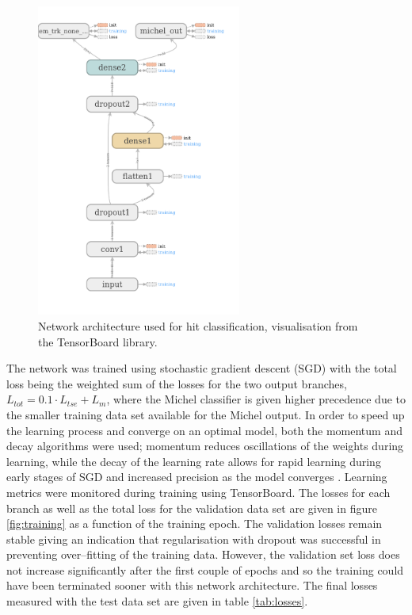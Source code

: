 \begin{figure}[h]
	\centering
	\includegraphics[width=0.6\textwidth]{figures/network_graph.png}
	\caption[Network architecture used for hit classification.]{Network
	architecture used for hit classification, visualisation from the TensorBoard
	library.}
	\label{fig:arch}
\end{figure}

The network was trained using stochastic gradient descent (SGD) with the total
loss being the weighted sum of the losses for the two output branches, \(L_{tot}
= 0.1 \cdot L_{tse} + L_m\), where the Michel classifier is given higher
precedence due to the smaller training data set available for the Michel output.
In order to speed up the learning process and converge on an optimal model, both
the momentum and decay algorithms were used; momentum reduces oscillations of
the weights during learning, while the decay of the learning rate allows for
rapid learning during early stages of SGD and increased precision as the model
converges \cite{Reed:1998:NSS:552600}. Learning metrics were monitored during
training using TensorBoard. The losses for each branch as well as the total loss
for the validation data set are given in figure \ref{fig:training} as a function
of the training epoch. The validation losses remain stable giving an indication
that regularisation with dropout was successful in preventing over--fitting of
the training data. However, the validation set loss does not increase
significantly after the first couple of epochs and so the training could have
been terminated sooner with this network architecture. The final losses measured
with the test data set are given in table \ref{tab:losses}. 

